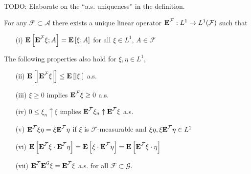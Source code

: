TODO: Elaborate on the ``a.s. uniqueness'' in the definition.

\begin{thm}\label{ConditionalExpectation}For
  any $\mathcal{F} \subset \mathcal{A}$ there exists a unique linear
  operator $\textbf{E}^\mathcal{F} : L^1 \to L^1(\mathcal{F})$
  such that 
\begin{itemize} 
\item[(i)]$\textbf{E}\left[\textbf{E}^{\mathcal{F}} \xi ; A\right] = \textbf{E}\left[\xi ;
    A\right]$ for all $\xi \in L^1$, $A \in \mathcal{F}$
\end{itemize}
The following properties also hold for $\xi, \eta \in L^1$,
\begin{itemize}
\item[(ii)]$\textbf{E}\left[\left \vert \textbf{E}^{\mathcal{F}} \xi \right \vert\right] \leq \textbf{E}\left[\left \vert \xi \right \vert\right]$ a.s.
\item[(iii)]$\xi \geq 0$ implies $\textbf{E}^{\mathcal{F}} \xi \geq
  0$ a.s.
\item[(iv)]$0 \leq \xi_n \uparrow \xi$ implies
  $\textbf{E}^{\mathcal{F}} \xi_n  \uparrow
  \textbf{E}^{\mathcal{F}} \xi$ a.s.
\item[(v)]$\textbf{E}^{\mathcal{F}} \xi \eta = \xi
  \textbf{E}^{\mathcal{F}} \eta$ if $\xi$ is
  $\mathcal{F}$-measurable and $\xi\eta,
  \xi\textbf{E}^{\mathcal{F}} \eta \in L^1$
\item[(vi)]$\textbf{E}\left[\textbf{E}^{\mathcal{F}} \xi
    \cdot \textbf{E}^{\mathcal{F}} \eta\right] = \textbf{E}\left[\xi \cdot
    \textbf{E}^{\mathcal{F}} \eta\right] = \textbf{E}\left[
    \textbf{E}^{\mathcal{F}} \xi \cdot \eta\right] $
\item[(vii)]$\textbf{E}^{\mathcal{F}} \textbf{E}^{\mathcal{G}} \xi
= \textbf{E}^{\mathcal{F}} \xi$ a.s. for all $\mathcal{F} \subset \mathcal{G}$.
\end{itemize}
\end{thm}
